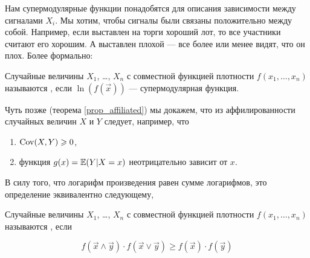 Нам супермодулярные функции понадобятся для описания зависимости между сигналами  $X_{i}$. Мы хотим, чтобы сигналы были связаны положительно между собой. Например, если выставлен на торги хороший лот, то все участники считают его хорошим. А выставлен плохой — все более или менее видят, что он плох. Более формально:


\begin{mydef}
Случайные величины $ X_{1} $, \ldots, $ X_{n} $ с совместной функцией плотности $ f(x_{1},\ldots,x_{n}) $ называются , если $ \ln(f(\vec{x})) $ — супермодулярная функция.
\end{mydef}

Чуть позже (теорема \ref{prop_affiliated}) мы докажем, что из аффилированности случайных величин $ X $ и $ Y $ следует, например, что
\begin{enumerate}
\item $\operatorname{Cov}(X,Y)\geqslant 0 $,
\item функция $g(x)= \operatorname{\mathbb{E}}(Y|X=x) $ неотрицательно зависит от $ x $.
\end{enumerate}

В силу того, что логарифм произведения равен сумме логарифмов, это определение эквивалентно следующему,
\begin{mydef}
Случайные величины $ X_{1} $, \ldots, $ X_{n} $ с совместной функцией плотности $ f(x_{1},\ldots,x_{n}) $ называются , если

\begin{equation}
f(\vec{x}\wedge\vec{y})\cdot f(\vec{x}\vee\vec{y})\geq f(\vec{x})\cdot f(\vec{y})
\end{equation}
\end{mydef}











